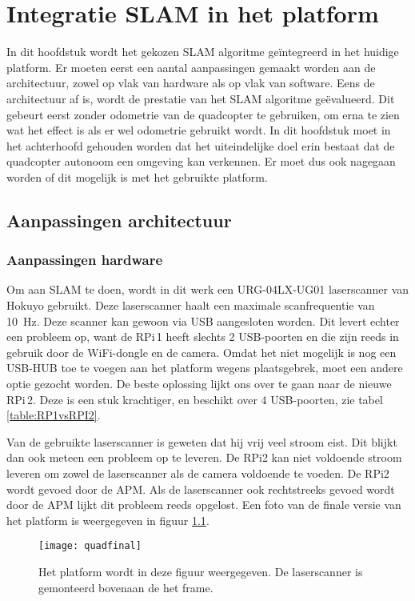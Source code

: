 \chapter{Integratie SLAM in het platform}
In dit hoofdstuk wordt het gekozen SLAM algoritme ge\"integreerd in het huidige platform. Er moeten eerst een aantal aanpassingen gemaakt worden aan de architectuur, zowel op vlak van hardware als op vlak van software. Eens de architectuur af is, wordt de prestatie van het SLAM algoritme ge\"evalueerd. Dit gebeurt eerst zonder odometrie van de quadcopter te gebruiken, om erna te zien wat het effect is als er wel odometrie gebruikt wordt. In dit hoofdstuk moet in het achterhoofd gehouden worden dat het uiteindelijke doel erin bestaat dat de quadcopter autonoom een omgeving kan verkennen. Er moet dus ook nagegaan worden of dit mogelijk is met het gebruikte platform.

\section{Aanpassingen architectuur}

\subsection{Aanpassingen hardware}
Om aan SLAM te doen, wordt in dit werk een URG-04LX-UG01 laserscanner van Hokuyo gebruikt. Deze laserscanner haalt een maximale scanfrequentie van \SI{10}{\Hz}. Deze scanner kan gewoon via USB aangesloten worden. Dit levert echter een probleem op, want de RPi\,1 heeft slechts 2 USB-poorten en die zijn reeds in gebruik door de WiFi-dongle en de camera. Omdat het niet mogelijk is nog een USB-HUB toe te voegen aan het platform wegens plaatsgebrek, moet een andere optie gezocht worden. De beste oplossing lijkt ons over te gaan naar de nieuwe RPi\,2. Deze is een stuk krachtiger, en beschikt over 4 USB-poorten, zie tabel \ref{table:RP1vsRPI2}.

\npar Van de gebruikte laserscanner is geweten dat hij vrij veel stroom eist. Dit blijkt dan ook meteen een probleem op te leveren. De RPi2 kan niet voldoende stroom  leveren om zowel de laserscanner als de camera voldoende te voeden. De RPi2 wordt gevoed door de APM. Als de laserscanner ook rechtstreeks gevoed wordt door de APM lijkt dit probleem reeds opgelost. Een foto van de finale versie van het platform is weergegeven in figuur \ref{fig:quadfinal}.

\begin{figure}[h]
	\centering
	\texttt{[image: quadfinal]}
	\caption{Het platform wordt in deze figuur weergegeven. De laserscanner is gemonteerd bovenaan de het frame.}\label{fig:quadfinal}
\end{figure}

